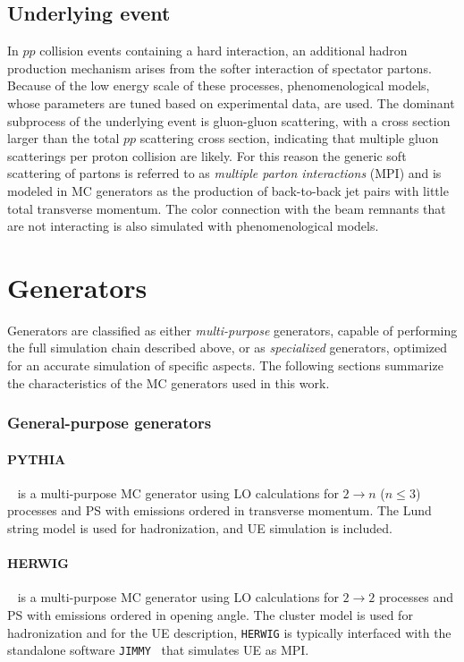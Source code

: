 \subsection{Underlying event}
\label{sec:underlyingevent}

In $pp$ collision events containing a hard interaction, an additional
hadron production mechanism arises from the softer interaction of
spectator partons. Because of the low energy scale of these processes,
phenomenological models, whose parameters are tuned based on
experimental data, are used. 
The dominant subprocess of the underlying event is gluon-gluon
scattering, with a cross section larger than the total $pp$ scattering
cross section, indicating that multiple gluon scatterings per proton
collision are likely. 
For this reason the generic soft scattering of partons is referred to
as {\it multiple parton interactions} (MPI) and is modeled in MC
generators as the production of back-to-back jet pairs with little
total transverse momentum. 
The color connection with the beam remnants that are not
interacting is also simulated with phenomenological models.

\section{Generators}
\label{sec:generators}

Generators are classified as either {\it multi-purpose}
generators, capable of performing the full simulation chain described
above, or as {\it specialized} generators, optimized for
an accurate simulation of specific aspects.
The following sections summarize the characteristics of the MC
generators used in this work.

\subsubsection*{General-purpose generators}

\paragraph{PYTHIA}~\cite{pythia6,pythia8} is a multi-purpose MC
generator using LO calculations for $2 \to n$ ($n\leq 3$) processes
and PS with emissions ordered in transverse momentum. 
The Lund string model is used for hadronization, and UE simulation is
included.

\paragraph{HERWIG}~\cite{herwig} is a multi-purpose MC generator using LO
calculations for $2 \to 2$ processes and PS with emissions ordered in
opening angle. 
The cluster model is used for hadronization and for the UE
description, \texttt{HERWIG} is typically interfaced with the
standalone software \texttt{JIMMY}~\cite{jimmy} that simulates UE as MPI.

